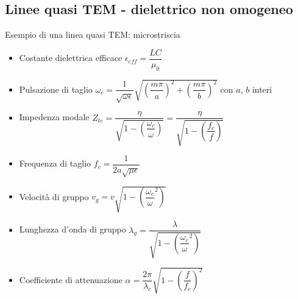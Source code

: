\documentclass{article}
\begin{document}
\subsection{Linee quasi TEM - dielettrico non omogeneo}
Esempio di una linea quasi TEM: microstriscia
\begin{itemize}
	\item Costante dielettrica efficace \( \epsilon_{eff} = \dfrac{LC}{\mu_0} \)
	\item Pulsazione di taglio \( \omega_c = \dfrac{1}{\sqrt{\omega \epsilon}} \sqrt{\left( \dfrac{m \pi}{a}\right)^2 + \left( \dfrac{m \pi}{b} \right)^2 }\) con \(a\), \(b\) interi
	\item Impedenza modale \( Z_{te} = \dfrac{\eta}{\sqrt{1-\left(\dfrac{\omega_c}{\omega} \right) }} = \dfrac{\eta}{\sqrt{1-\left(\dfrac{f_c}{f} \right) }} \)
	\item Frequenza di taglio \( f_c = \dfrac{1}{2a \sqrt{\mu \epsilon}} \)
	\item Velocità di gruppo \( v_g = v \sqrt{1- \left( \dfrac{\omega_c}{\omega} ^ 2 \right)} \)
	\item Lunghezza d'onda di gruppo \( \lambda_g = \dfrac{\lambda}{\sqrt{1- \left( \dfrac{\omega_c}{\omega} ^ 2 \right)}}\)
	\item Coefficiente di attenuazione \( \alpha = \dfrac{2 \pi}{\lambda_c} \sqrt{1 - \left( \dfrac{f}{f_c} \right) ^ 2} \)
\end{itemize}

\newpage
\end{document}
